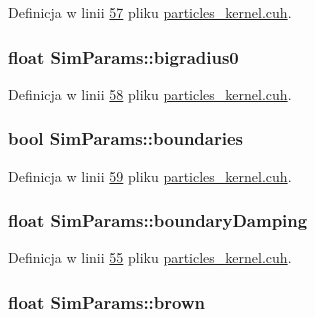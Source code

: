 Definicja w linii \hyperlink{particles__kernel_8cuh_source_l00057}{57} pliku \hyperlink{particles__kernel_8cuh_source}{particles\-\_\-kernel.\-cuh}.

\hypertarget{struct_sim_params_a5809a1ec819f5a99e350ed28b01834fc}{
\subsubsection[{bigradius0}]{\setlength{\rightskip}{0pt plus 5cm}float Sim\-Params\-::bigradius0}}\label{struct_sim_params_a5809a1ec819f5a99e350ed28b01834fc}


Definicja w linii \hyperlink{particles__kernel_8cuh_source_l00058}{58} pliku \hyperlink{particles__kernel_8cuh_source}{particles\-\_\-kernel.\-cuh}.

\hypertarget{struct_sim_params_a01507f06cc018071a0eb741438aaa09b}{
\subsubsection[{boundaries}]{\setlength{\rightskip}{0pt plus 5cm}bool Sim\-Params\-::boundaries}}\label{struct_sim_params_a01507f06cc018071a0eb741438aaa09b}


Definicja w linii \hyperlink{particles__kernel_8cuh_source_l00059}{59} pliku \hyperlink{particles__kernel_8cuh_source}{particles\-\_\-kernel.\-cuh}.

\hypertarget{struct_sim_params_a4da0c7593d6569e48ee50e7d0c7576f9}{
\subsubsection[{boundary\-Damping}]{\setlength{\rightskip}{0pt plus 5cm}float Sim\-Params\-::boundary\-Damping}}\label{struct_sim_params_a4da0c7593d6569e48ee50e7d0c7576f9}


Definicja w linii \hyperlink{particles__kernel_8cuh_source_l00055}{55} pliku \hyperlink{particles__kernel_8cuh_source}{particles\-\_\-kernel.\-cuh}.

\hypertarget{struct_sim_params_a88dae34e74c9184adfa9169bad06d0ee}{
\subsubsection[{brown}]{\setlength{\rightskip}{0pt plus 5cm}float Sim\-Params\-::brown}}\label{struct_sim_params_a88dae34e74c9184adfa9169bad06d0ee}


